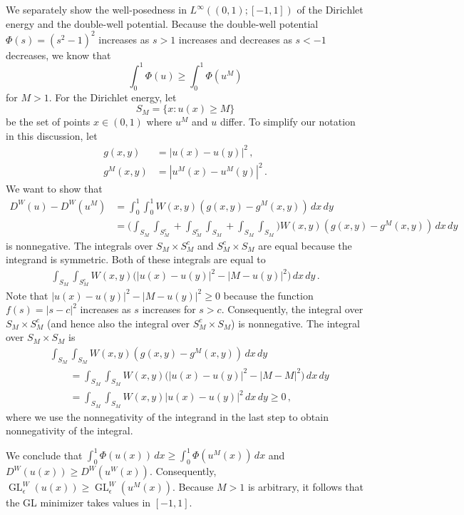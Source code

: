 \documentclass[11pt]{amsart}
\def\ep{\epsilon}
\def\GL{\operatorname{GL}}
\numberwithin{equation}{section}
\begin{document}
{{We separately show the well-posedness in $L^\infty((0,1);[-1,1])$ of the Dirichlet energy and the double-well potential. Because the double-well potential $\Phi(s) = (s^2 - 1)^2$ increases as $s > 1$ increases and decreases as $s < -1$ decreases, we know that 
\begin{equation}
	\int_0^1\Phi(u) \geq \int_0^1 \Phi(u^M) 
\end{equation}	
{for $M >1$.} For the Dirichlet energy, let 
\begin{equation}
	S_M = \{x: u(x) \geq M\}
\end{equation}	
be the set of points $x \in (0,1)$ where $u^M$ and $u$ differ. To simplify our notation in this discussion, let
\begin{align*}
    g(x,y) &= |u(x) - u(y)|^2\,, \\
    g^M(x,y) &= |u^M(x) - u^M(y)|^2\,.
\end{align*}
We want to show that
\begin{align*}
    D^W(u) - D^W(u^M) &= \int_0^1 \int_0^1 W(x,y) \left(g(x,y) - g^M(x,y)\right) \,dx \, dy \\
    &= \Bigg(\int_{S_M} \int_{S_M^c} + \int_{S_M^c} \int_{S_M} + \int_{S_M} \int_{S_M} \Bigg) W(x,y)\left(g(x,y) - g^M(x,y)\right) \,dx \, dy 
\end{align*}
is nonnegative. The integrals over $S_M \times S_M^c$ and $S_M^c \times S_M$ are equal because the integrand is symmetric. Both of these integrals are equal to
\begin{align*}
    \int_{S_M} \int_{S_M^c} W(x,y) \Big(|u(x) - u(y)|^2 - |M - u(y)|^2\Big)  \,dx \,dy\,.
\end{align*}
Note that $|u(x) - u(y)|^2 - |M - u(y)|^2 \geq 0$ because the function $f(s) = |s - c|^2$ increases as $s$ increases for $s > c$. Consequently, the integral over $S_M \times S_M^c$ (and hence also the integral over $S_M^c \times S_M$) is nonnegative.
The integral over $S_M \times S_M$ is
\begin{align*}
  &  \int_{S_M} \int_{S_M} W(x,y) (g(x,y)- g^M(x,y)) \, dx\,dy \\
    &\qquad = \int_{S_M} \int_{S_M} W(x,y) \Big(|u(x) - u(y)|^2 - |M - M|^2\Big)  \,dx\,dy \\
    &\qquad = \int_{S_M} \int_{S_M} W(x,y) |u(x) - u(y)|^2 \,dx\,dy \geq 0 \,,
\end{align*}
where we use the nonnegativity of the integrand in the last step to obtain nonnegativity of the integral.

We conclude that $\int_0^1 \Phi(u(x)) \,dx \geq \int_0^1 \Phi(u^M(x)) \,dx$ and $D^W(u(x)) \geq D^W(u^W(x))$. Consequently, $\GL^W_\ep(u(x)) \geq \GL^W_\ep(u^M(x))$. Because $M > 1$ is arbitrary, it follows that the GL minimizer takes values in $[-1,1]$.



}}
\end{document}
